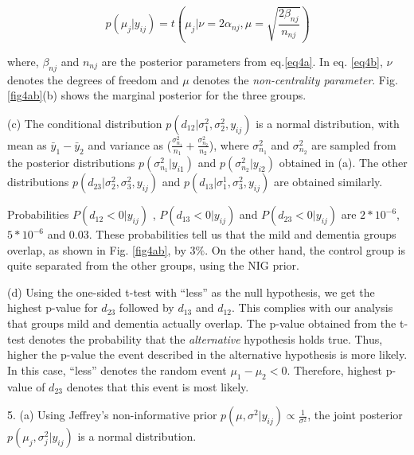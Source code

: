 \documentclass[11pt]{article}
\begin{document}
\begin{equation}
 p(\mu_{j} | y_{ij}) = t(\mu_{j} | \nu = 2\alpha_{nj}, \mu = \sqrt{ \frac{2\beta_{nj}}{n_{nj}} })
\label{eq4b}
\end{equation}

where, $\beta_{nj}$ and $n_{nj}$ are the posterior parameters from eq.\ref{eq4a}. In eq. \ref{eq4b}, $\nu$ denotes the degrees of freedom and $\mu$ denotes the \emph{non-centrality parameter}. Fig. \ref{fig4ab}(b) shows the marginal posterior for the three groups. 

\par (c) The conditional distribution $p(d_{12} | \sigma^{2}_{1}, \sigma^{2}_{2}, y_{ij})$ is a normal distribution, with mean as $\bar{y}_{1} - \bar{y}_{2}$ and variance as ($\frac{\sigma^{2}_{n_1}}{n_1}  + \frac{\sigma^{2}_{n_2}}{n_2}$), where $\sigma^{2}_{n_1}$ and $\sigma^{2}_{n_2}$ are sampled from the posterior distributions $p(\sigma^{2}_{n_1} | y_{i1})$ and $p(\sigma^{2}_{n_2} | y_{i2})$ obtained in (a). The other distributions $p(d_{23} | \sigma^{2}_{2}, \sigma^{2}_{3}, y_{ij})$ and $p(d_{13} | \sigma^{1}_{1}, \sigma^{2}_{3}, y_{ij})$ are obtained similarly.  

\par Probabilities $P(d_{12} < 0 | y_{ij})$ , $P(d_{13} < 0 | y_{ij})$ and $P(d_{23} < 0 | y_{ij})$ are $2*10^{-6}$, $5 * 10^{-6}$ and 0.03. These probabilities tell us that the mild and dementia groups overlap, as shown in Fig. \ref{fig4ab}, by $3\%$. On the other hand, the control group is quite separated from the other groups, using the NIG prior.

\par (d) Using the one-sided t-test with ``less'' as the null hypothesis, we get the highest p-value for $d_{23}$ followed by $d_{13}$ and $d_{12}$. This complies with our analysis that groups mild and dementia actually overlap. The p-value obtained from the t-test denotes the probability that the \emph{alternative} hypothesis holds true. Thus, higher the p-value the event described in the alternative hypothesis  is more likely. In this case, ``less'' denotes the random event $\mu_1 - \mu_2 < 0$. Therefore, highest p-value of $d_{23}$ denotes that this event is most likely. 


\par 5. (a) Using Jeffrey's non-informative prior $p(\mu, \sigma^{2} | y_{ij}) \propto \frac{1}{\sigma^2}$, the joint posterior $p(\mu_j, \sigma^{2}_{j} | y_{ij})$ is a normal distribution.
\end{document}
